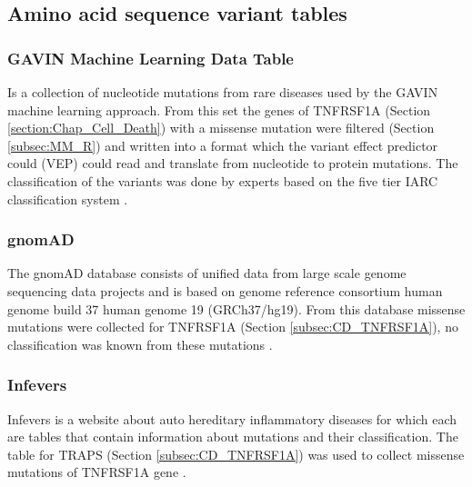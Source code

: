 \subsection{Amino acid sequence variant tables}

\subsubsection{GAVIN Machine Learning Data Table}
Is a collection of nucleotide mutations from rare diseases used by the GAVIN \cite{van_der_velde_gavin:_2017} machine learning approach. From this set the genes of TNFRSF1A (Section \ref{section:Chap_Cell_Death}) with a missense mutation were filtered (Section \ref{subsec:MM_R}) and written into a format which the variant effect predictor could (VEP) \cite{ensembl_variant_nodate} could read and translate from nucleotide to protein mutations. The classification of the variants was done by experts based on the five tier IARC classification system \cite{plon_sequence_2008}. 
\label{subsec:MM_GAVIN_data_table}

\subsubsection{gnomAD}
The gnomAD database consists of unified data from large scale genome sequencing data projects and is based on genome reference consortium human genome build 37 human genome 19 (GRCh37/hg19). From this database missense mutations were collected for TNFRSF1A (Section \ref{subsec:CD_TNFRSF1A}), no classification was known from these mutations \cite{gnomad_gnomad_nodate}.
\label{subsec:MM_GnomAD}

\subsubsection{Infevers}
Infevers is a website about auto hereditary inflammatory diseases for which each are tables that contain information about mutations and their classification. The table for TRAPS (Section \ref{subsec:CD_TNFRSF1A}) was used to collect missense mutations of TNFRSF1A gene \cite{sarrauste_de_menthiere_infevers:_2003}.
\label{subsec:MM_Infevers}

